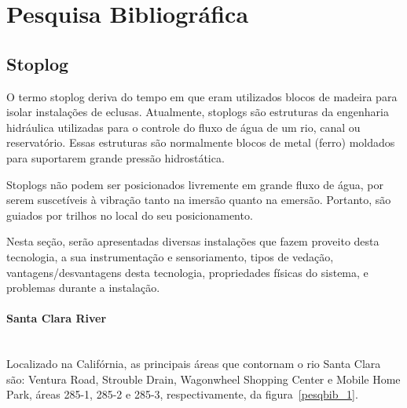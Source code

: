 

\section{Pesquisa Bibliográfica}
\label{pesqbib}
\subsection{Stoplog}
O termo stoplog deriva do tempo em que eram utilizados blocos de madeira para
isolar instalações de eclusas. Atualmente, stoplogs são estruturas da engenharia
hidráulica utilizadas para o controle do fluxo de água de um rio, canal ou
reservatório. Essas estruturas são normalmente blocos de metal (ferro) moldados
para suportarem grande pressão hidrostática. 

Stoplogs não podem ser posicionados livremente em grande fluxo de água, por
serem suscetíveis à vibração tanto na imersão quanto na emersão. Portanto, são guiados por trilhos no local do seu posicionamento.

Nesta seção, serão apresentadas diversas instalações que fazem proveito desta tecnologia, a sua instrumentação e sensoriamento, tipos de vedação, vantagens/desvantagens desta tecnologia, propriedades físicas do sistema, e problemas durante a instalação.  

\paragraph{Santa Clara River}\mbox{}\\
Localizado na Califórnia, as principais áreas que contornam o rio Santa Clara
são: Ventura Road, Strouble Drain, Wagonwheel Shopping Center e Mobile Home
Park, áreas 285-1, 285-2 e 285-3, respectivamente, da figura~\ref{pesqbib_1}.

